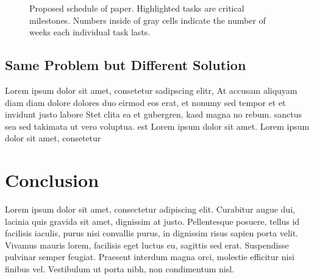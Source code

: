 \begin{figure}[h] %
    \caption{Proposed schedule of paper. Highlighted tasks are critical milestones. Numbers inside of gray cells indicate the number of weeks each individual task lasts.}
\end{figure}


\subsection{Same Problem but Different Solution}
Lorem ipsum dolor sit amet, consetetur sadipscing elitr, At accusam aliquyam diam diam dolore dolores duo eirmod eos erat, et nonumy sed tempor et et invidunt justo labore Stet clita ea et gubergren, kasd magna no rebum. sanctus sea sed takimata ut vero voluptua. est Lorem ipsum dolor sit amet. Lorem ipsum dolor sit amet, consetetur\\
\section{Conclusion}
 Lorem ipsum dolor sit amet, consectetur adipiscing elit. Curabitur augue dui, lacinia quis gravida sit amet, dignissim at justo. Pellentesque posuere, tellus id facilisis iaculis, purus nisi convallis purus, in dignissim risus sapien porta velit. Vivamus mauris lorem, facilisis eget luctus eu, sagittis sed erat. Suspendisse pulvinar semper feugiat. Praesent interdum magna orci, molestie efficitur nisi finibus vel. Vestibulum ut porta nibh, non condimentum nisl.
